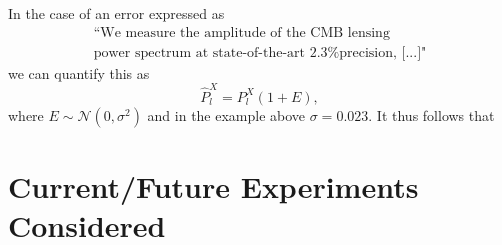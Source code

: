 \documentclass[11pt]{article} %
\begin{document}
In the case of an error expressed as
\begin{gather*}
	\text{``We measure the amplitude of the CMB lensing} \\\text{
	power spectrum at state-of-the-art 2.3\% precision, [...]"}
\end{gather*}
we can quantify this as
\begin{equation*}
	\hat P^X_l = P_l^X(1+E),
\end{equation*}
where $E\sim \mathcal N(0, \sigma^2)$ and in the example above $\sigma = 0.023$. It thus follows that





\section{Current/Future Experiments Considered}
\end{document}
